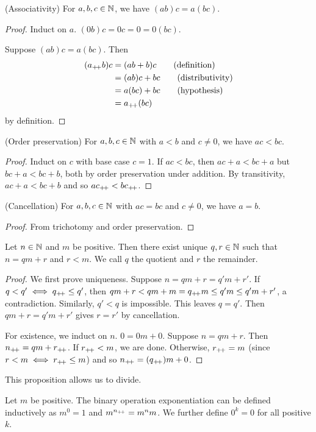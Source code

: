 \begin{problem}
    (Associativity) For $a, b, c \in \mathbb{N}$, we have $(ab)c = a(bc)$.
\end{problem}
\begin{proof}
    Induct on $a$.
    $(0b)c = 0c = 0 = 0(bc)$.

    Suppose $(ab)c = a(bc)$.
    Then \begin{align*}
        (a_{+\!+} b)c &= (ab + b)c \tag{definition} \\
                  &= (ab)c + bc \tag{distributivity} \\
                  &= a(bc) + bc \tag{hypothesis} \\
                  &= a_{+\!+}(bc)
    \end{align*} by definition.
\end{proof}
\begin{problem}
    (Order preservation) For $a, b, c \in \mathbb{N}$ with $a < b$ and $c \ne 0$,
    we have $ac < bc$.
\end{problem}
\begin{proof}
    Induct on $c$ with base case $c = 1$.
    If $ac < bc$, then $ac + a < bc + a$ but $bc + a < bc + b$, both by order
    preservation under addition.
    By transitivity, $ac + a < bc + b$ and so $ac_{+\!+} < bc_{+\!+}$.
\end{proof}
\begin{problem}
    (Cancellation) For $a, b, c \in \mathbb{N}$ with $ac = bc$ and $c \ne 0$, we have
    $a = b$.
\end{problem}
\begin{proof}
    From trichotomy and order preservation.
\end{proof}

\begin{proposition} \label{thm:euclidean_algorithm}
    Let $n \in \mathbb{N}$ and $m$ be positive.
    Then there exist unique $q, r \in \mathbb{N}$ such that $n = qm + r$ and $r < m$.
    We call $q$ the quotient and $r$ the remainder.
\end{proposition}
\begin{proof}
    We first prove uniqueness.
    Suppose $n = qm + r = q'm + r'$.
    If $q < q' \iff q_{+\!+} \le q'$, then $qm + r < qm + m = q_{+\!+} m \le q'm
    \le q'm + r'$, a contradiction.
    Similarly, $q' < q$ is impossible.
    This leaves $q = q'$.
    Then $qm + r = q'm + r'$ gives $r = r'$ by cancellation.

    For existence, we induct on $n$.
    $0 = 0m + 0$.
    Suppose $n = qm + r$.
    Then $n_{+\!+} = qm + r_{+\!+}$.
    If $r_{+\!+} < m$, we are done.
    Otherwise, $r_{+\!+} = m$ (since $r < m \iff r_{+\!+} \le m$) and so
    $n_{+\!+} = (q_{+\!+})m + 0$.
\end{proof}
This proposition allows us to divide.

\begin{definition}[Exponentiation] \label{def:exponentiation}
    Let $m$ be positive.
    The binary operation exponentiation can be defined inductively as
    $m ^ 0 = 1$ and $m ^ {n_{+\!+}} = m ^ n m$.
    We further define $0 ^ k = 0$ for all positive $k$.
\end{definition}
